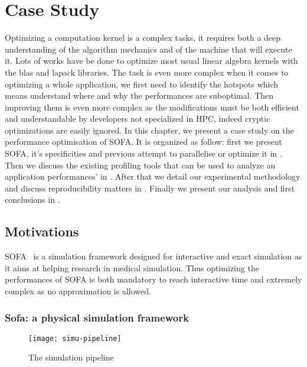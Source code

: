 \chapter{Case Study}
\label{chap:perf}

Optimizing a computation kernel is a complex tasks, it requires both a deep
understanding of the algorithm mechanics and of the machine that will execute
it. Lots of works have be done to optimize most usual linear algebra kernels
with the blas and lapack libraries.  The task is even more
complex when it comes to optimizing a whole application, we first need to
identify the hotspots which means understand where and why the performances
are suboptimal. Then improving them is even more complex as the modifications
must be both efficient and understandable by developers not specialized in
\gls{HPC}, indeed cryptic optimizations are easily ignored. 
In this chapter, we present a case study on the performance optimisation of
\gls{SOFA}. It is organized as follow: first we present \gls{SOFA}, it's
specificities and previous attempt to parallelise or optimize it in
. Then we discuss the existing profiling tools that can
be used to analyze an application performances' in . After
that we detail our experimental methodology and discuss reproducibility
matters in . Finally we present our analysis and first
conclusions in .

\section{Motivations}
\label{sec:motivations}


\gls{SOFA}~\cite{Allard07SOFA} is a simulation framework designed for
interactive and exact simulation as it aims at helping research in medical
simulation. Thus optimizing the performances of \gls{SOFA} is both mandatory
to reach interactive time and extremely complex as no approximation is
allowed.

\subsection{Sofa: a physical simulation framework}

\begin{figure}[htb]
    \centering
    \texttt{[image: simu-pipeline]}
    \caption[The simulation pipeline]{The simulation pipeline}
    \label{fig:simu-pipeline}
\end{figure}


